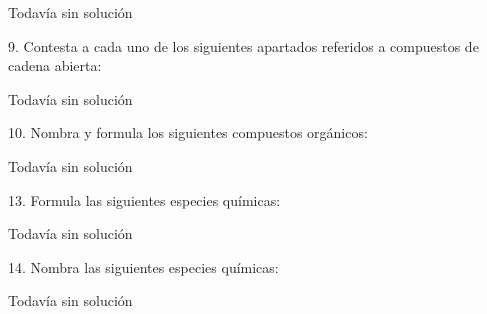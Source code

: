 \documentclass{article}
\begin{document}
\begin{solution}[print=false]
  Todavía sin solución
\end{solution}

\begin{exercise}
  9. Contesta a cada uno de los siguientes apartados referidos a
  compuestos de cadena abierta:
\end{exercise}

\begin{solution}[print=false]
  Todavía sin solución
\end{solution}

\begin{exercise}
  10. Nombra y formula los siguientes compuestos orgánicos:
\end{exercise}

\begin{solution}[print=false]
  Todavía sin solución
\end{solution}

\begin{exercise}
  13. Formula las siguientes especies químicas:
\end{exercise}

\begin{solution}[print=false]
  Todavía sin solución
\end{solution}

\begin{exercise}
  14. Nombra las siguientes especies químicas:
\end{exercise}

\begin{solution}[print=false]
  Todavía sin solución
\end{solution}
\end{document}
